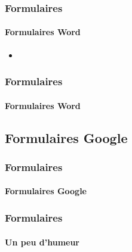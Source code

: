 \documentclass[xcolor=table]{beamer}
\begin{document}
\begin{frame}
\frametitle{Formulaires}
\framesubtitle{Formulaires Word}

\begin{itemize}
	\item 
\end{itemize}

\end{frame}

\begin{frame}
\frametitle{Formulaires}
\framesubtitle{Formulaires Word}

\end{frame}

\subsection{Formulaires Google}

\begin{frame}
\frametitle{Formulaires}
\framesubtitle{Formulaires Google}

\end{frame}


\begin{frame}
\frametitle{Formulaires}
\framesubtitle{Un peu d'humeur}
\begin{center}
\end{center}
\end{frame}


\end{document}
